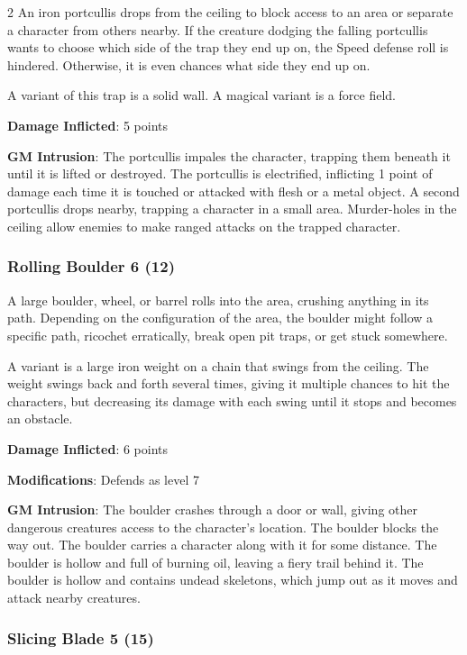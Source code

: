 \begin{multicols}{2}
An iron portcullis drops from the ceiling to block access to an area or separate a character from others nearby. If the creature dodging the falling portcullis wants to choose which side of the trap they end up on, the Speed defense roll is hindered. Otherwise, it is even chances what side they end up on. 

A variant of this trap is a solid wall. A magical variant is a force field. 

\textbf{Damage Inflicted}: 5 points

\textbf{GM Intrusion}: The portcullis impales the character, trapping them beneath it until it is lifted or destroyed. The portcullis is electrified, inflicting 1 point of damage each time it is touched or attacked with flesh or a metal object. A second portcullis drops nearby, trapping a character in a small area. Murder-holes in the ceiling allow enemies to make ranged attacks on the trapped character.

\subsubsection{Rolling Boulder 6 (12)}

A large boulder, wheel, or barrel rolls into the area, crushing anything in its path. Depending on the configuration of the area, the boulder might follow a specific path, ricochet erratically, break open pit traps, or get stuck somewhere. 

A variant is a large iron weight on a chain that swings from the ceiling. The weight swings back and forth several times, giving it multiple chances to hit the characters, but decreasing its damage with each swing until it stops and becomes an obstacle. 

\textbf{Damage Inflicted}: 6 points 

\textbf{Modifications}: Defends as level 7 

\textbf{GM Intrusion}: The boulder crashes through a door or wall, giving other dangerous creatures access to the character’s location. The boulder blocks the way out. The boulder carries a character along with it for some distance. The boulder is hollow and full of burning oil, leaving a fiery trail behind it. The boulder is hollow and contains undead skeletons, which jump out as it moves and attack nearby creatures.

\subsubsection{Slicing Blade 5 (15)}


\end{multicols}
